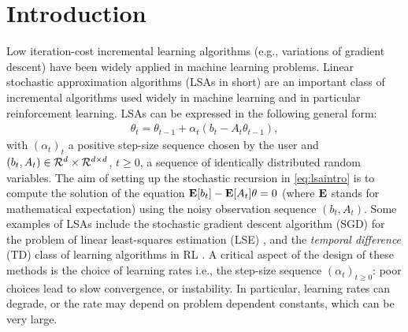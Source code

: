 \section{Introduction}\label{sec:intro}
Low iteration-cost incremental learning algorithms (e.g., variations of gradient descent) have been widely applied in machine learning problems. Linear stochastic approximation algorithms (LSAs in short) are an important class of incremental algorithms used widely in machine learning and in particular reinforcement learning. LSAs can be expressed in the following general form:
\begin{align}\label{eq:lsaintro}
\theta_t=\theta_{t-1}+\alpha_t (b_t-A_t \theta_{t-1}),
\end{align}
with $(\alpha_t)_t$ a positive step-size sequence chosen by the user and 
$(b_t,A_t)\in \mathcal{R}^d\times \mathcal{R}^{d \times d}$,  $t\geq 0$, a sequence of identically distributed random variables. The aim of setting up the stochastic recursion in \eqref{eq:lsaintro} is to compute the solution of the equation 
$\mathbf{E}[b_t] - \mathbf{E}[A_t] \theta = 0$ (where $\mathbf{E}$ stands for mathematical expectation) using the noisy observation sequence $(b_t,A_t)$.
Some examples of LSAs include the stochastic gradient descent algorithm (SGD) for the problem of linear least-squares estimation  (LSE) \cite{bach,bachaistats}, and the \emph{temporal difference} (TD) class of learning algorithms in RL \cite{sutton,konda-tsitsiklis,KoTsi03:LSA,gtd,gtd2,gtdmp}.
 A critical aspect of the design of these methods is the choice of learning rates i.e., the step-size sequence $(\alpha_t)_{t\geq 0}$: poor choices lead to slow convergence, or instability. In particular, learning rates can degrade, or the rate may depend on problem dependent constants, which can be very large. 
